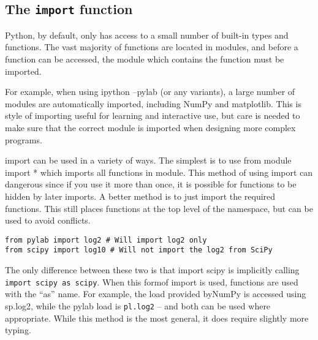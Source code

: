 \documentclass[KSmain.tex]{subfiles}
\begin{document}
\subsection{The \texttt{import} function}
Python, by default, only has access to a small number of built-in types and functions. The vast majority of
functions are located in modules, and before a function can be accessed, the module which contains the
function must be imported. 

For example, when using ipython --pylab (or any variants), a large number
of modules are automatically imported, including NumPy and matplotlib. This is style of importing useful
for learning and interactive use, but care is needed to make sure that the correct module is imported when
designing more complex programs.

import can be used in a variety of ways. The simplest is to use from module import * which imports
all functions in module. This method of using import can dangerous since if you use it more than once,
it is possible for functions to be hidden by later imports. A better method is to just import the required
functions. This still places functions at the top level of the namespace, but can be used to avoid conflicts.
\begin{framed}
\begin{verbatim}
from pylab import log2 # Will import log2 only
from scipy import log10 # Will not import the log2 from SciPy
\end{verbatim}
\end{framed}
The only difference between these two is that import scipy is implicitly calling \texttt{import scipy as scipy}.
When this formof import is used, functions are used with the “as” name. For example, the load provided
byNumPy is accessed using sp.log2, while the pylab load is \texttt{pl.log2} – and both can be used where appropriate.
While this method is the most general, it does require slightly more typing.
\end{document}
